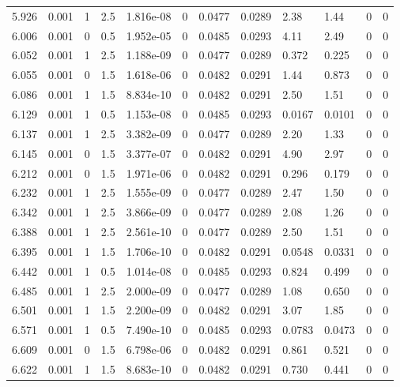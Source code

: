 \documentclass[preview]{standalone}
\begin{document}
{{{{{\begin{tabular}{L{1.2cm}C{1.2cm} C{0.3cm}C{0.5cm} C{1.4cm}C{1.4cm} C{1.4cm}C{1.4cm} C{1.6cm}C{1.6cm} C{1.6cm}C{1.6cm}}
  5.926  &  0.001  & 1     & 2.5 &  1.816e-08  & 0  &  0.0477&   0.0289& 2.38 & 1.44   &  0 & 0  \\ 
  6.006  &  0.001  & 0     & 0.5 &  1.952e-05  & 0  &  0.0485&   0.0293& 4.11 & 2.49   &  0 & 0  \\ 
  6.052  &  0.001  & 1     & 2.5 &  1.188e-09  & 0  &  0.0477&   0.0289& 0.372 & 0.225   &  0 & 0  \\ 
  6.055  &  0.001  & 0     & 1.5 &  1.618e-06  & 0  &  0.0482&   0.0291& 1.44 & 0.873   &  0 & 0  \\ 
  6.086  &  0.001  & 1     & 1.5 &  8.834e-10  & 0  &  0.0482&   0.0291& 2.50 & 1.51   &  0 & 0  \\ 
  6.129  &  0.001  & 1     & 0.5 &  1.153e-08  & 0  &  0.0485&   0.0293& 0.0167 & 0.0101   &  0 & 0  \\ 
  6.137  &  0.001  & 1     & 2.5 &  3.382e-09  & 0  &  0.0477&   0.0289& 2.20 & 1.33   &  0 & 0  \\ 
  6.145  &  0.001  & 0     & 1.5 &  3.377e-07  & 0  &  0.0482&   0.0291& 4.90 & 2.97   &  0 & 0  \\ 
  6.212  &  0.001  & 0     & 1.5 &  1.971e-06  & 0  &  0.0482&   0.0291& 0.296 & 0.179   &  0 & 0  \\ 
  6.232  &  0.001  & 1     & 2.5 &  1.555e-09  & 0  &  0.0477&   0.0289& 2.47 & 1.50   &  0 & 0  \\ 
  6.342  &  0.001  & 1     & 2.5 &  3.866e-09  & 0  &  0.0477&   0.0289& 2.08 & 1.26   &  0 & 0  \\ 
  6.388  &  0.001  & 1     & 2.5 &  2.561e-10  & 0  &  0.0477&   0.0289& 2.50 & 1.51   &  0 & 0  \\ 
  6.395  &  0.001  & 1     & 1.5 &  1.706e-10  & 0  &  0.0482&   0.0291& 0.0548 & 0.0331   &  0 & 0  \\ 
  6.442  &  0.001  & 1     & 0.5 &  1.014e-08  & 0  &  0.0485&   0.0293& 0.824 & 0.499   &  0 & 0  \\ 
  6.485  &  0.001  & 1     & 2.5 &  2.000e-09  & 0  &  0.0477&   0.0289& 1.08 & 0.650   &  0 & 0  \\ 
  6.501  &  0.001  & 1     & 1.5 &  2.200e-09  & 0  &  0.0482&   0.0291& 3.07 & 1.85   &  0 & 0  \\ 
  6.571  &  0.001  & 1     & 0.5 &  7.490e-10  & 0  &  0.0485&   0.0293& 0.0783 & 0.0473   &  0 & 0  \\ 
  6.609  &  0.001  & 0     & 1.5 &  6.798e-06  & 0  &  0.0482&   0.0291& 0.861 & 0.521   &  0 & 0  \\ 
  6.622  &  0.001  & 1     & 1.5 &  8.683e-10  & 0  &  0.0482&   0.0291& 0.730 & 0.441   &  0 & 0  \\ 

\end{tabular}}}}}}
\end{document}
